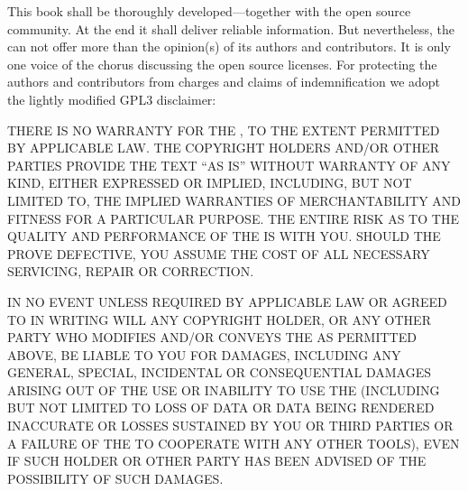 %
%
%
%

%


This book shall be thoroughly developed---together with the open source
community. At the end it shall deliver reliable information. But nevertheless,
the \oslic{} can not offer more than the opinion(s) of its authors and
contributors. It is only one voice of the chorus discussing the open source
licenses. For protecting the authors and contributors from charges and claims of
indemnification we adopt the lightly modified GPL3 disclaimer:

{
\newcommand\gummi{\hspace{0pt plus 1pc}}
THERE IS NO WARRANTY FOR THE \oslic{}, TO THE EXTENT PERMITTED BY APPLICABLE LAW.
THE COPYRIGHT HOLDERS AND/OR OTHER PARTIES PROVIDE THE TEXT “AS IS” WITHOUT
WARRANTY OF ANY KIND, EITHER EXPRESSED OR IMPLIED, INCLUDING, BUT NOT LIMITED
TO, THE IMPLIED WARRANTIES OF MERCHANTABILITY AND FITNESS FOR A PARTICULAR
PURPOSE. THE ENTIRE RISK AS TO THE QUALITY AND PERFORMANCE OF THE \oslic{} IS
WITH YOU. \gummi SHOULD THE \oslic{} PROVE DEFECTIVE, \gummi YOU ASSUME THE COST OF ALL
NECESSARY SERVICING, REPAIR OR CORRECTION.

IN NO EVENT \gummi UNLESS REQUIRED BY APPLICABLE LAW \gummi OR AGREED TO IN WRITING WILL ANY
COPYRIGHT HOLDER, OR ANY OTHER PARTY WHO MODIFIES AND/OR CONVEYS THE \oslic{} AS
PERMITTED ABOVE, BE LIABLE TO YOU FOR DAMAGES, INCLUDING ANY GENERAL, \gummi SPECIAL, \gummi
INCIDENTAL \gummi OR CONSEQUENTIAL DAMAGES ARISING OUT OF THE USE OR INABILITY TO USE
THE \oslic{} (INCLUDING BUT NOT LIMITED TO LOSS OF DATA OR DATA BEING RENDERED
INACCURATE OR LOSSES SUSTAINED BY YOU OR THIRD PARTIES OR A FAILURE OF THE
\oslic{} TO COOPERATE WITH ANY OTHER TOOLS), EVEN IF SUCH HOLDER OR OTHER PARTY
HAS BEEN ADVISED OF THE POSSIBILITY OF SUCH DAMAGES.
}

